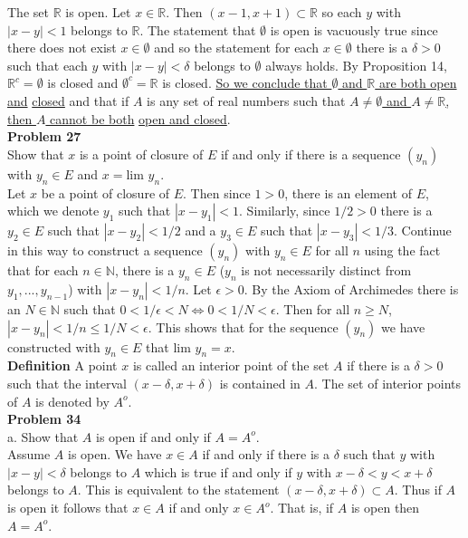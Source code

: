 \documentclass[a4paper]{article}
\begin{document}
The set $\mathbb{R}$ is open. Let $x \in \mathbb{R}$. Then $(x-1, x+1) \subset \mathbb{R}$ so each $y$ with $|x-y| < 1$ belongs to $\mathbb{R}$. The statement that $\emptyset$ is open is vacuously true since there does not exist $x \in \emptyset$ and so the statement for each $x \in \emptyset$ there is a $\delta>0$ such that each $y$ with $|x-y| < \delta$ belongs to $\emptyset$ always holds. By Proposition 14, $\mathbb{R}^c = \emptyset$ is closed and $\emptyset^c = \mathbb{R}$ is closed. \underline{So we conclude that $\emptyset$ and $ \mathbb{R}$ are both open and} \underline{closed} and that if $A$ is any set of real numbers such that \underline{$A\neq \emptyset$ and $A \neq \mathbb{R}$, then $A$ cannot be both} \underline{open and closed}.\\

{\bf Problem 27}\\
Show that $x$ is a point of closure of $E$ if and only if there is a sequence $(y_n)$ with $y_n \in E$ and $x = \text{lim } y_n$. \\

Let $x$ be a point of closure of $E$. Then since $1>0$, there is an element of $E$, which we denote $y_1$ such that $|x-y_1| < 1$. Similarly, since $1/2 > 0$ there is a $y_2 \in E$ such that $|x-y_2|<1/2$ and a $y_3 \in E$ such that $|x-y_3| < 1/3$. Continue in this way to construct a sequence $(y_n)$ with $y_n \in E$ for all $n$ using the fact that for each $n \in \mathbb{N}$, there is a $y_n \in E$ ($y_n$ is not necessarily distinct from $y_1,...,y_{n-1}$) with $|x-y_n| < 1/n$. Let $\epsilon>0$. By the Axiom of Archimedes there is an $N \in \mathbb{N}$ such that $0<1/\epsilon < N \iff 0<1/N < \epsilon$. Then for all $n\geq N$, $|x-y_n| < 1/n \leq 1/N < \epsilon$. This shows that for the sequence $(y_n)$ we have constructed with $y_n \in E$ that lim $y_n = x$.\\ 


{\bf Definition} A point $x$ is called an interior point of the set $A$ if there is a $\delta >0$ such that the interval $(x-\delta, x+\delta)$ is contained in $A$. The set of interior points of $A$ is denoted by $A^o$.\\


{\bf Problem 34}\\

a. Show that $A$ is open if and only if $A = A^o$.\\

Assume $A$ is open. We have $x \in A$ if and only if there is a $\delta$ such that $y$ with $|x-y|<\delta$ belongs to $A$ which is true if and only if $y$ with $x-\delta < y < x+\delta$ belongs to $A$. This is equivalent to the statement $(x-\delta, x+\delta) \subset A$. Thus if $A$ is open it follows that $x \in A$ if and only $x \in A^o$. That is, if $A$ is open then $A = A^o$. \\
\end{document}
